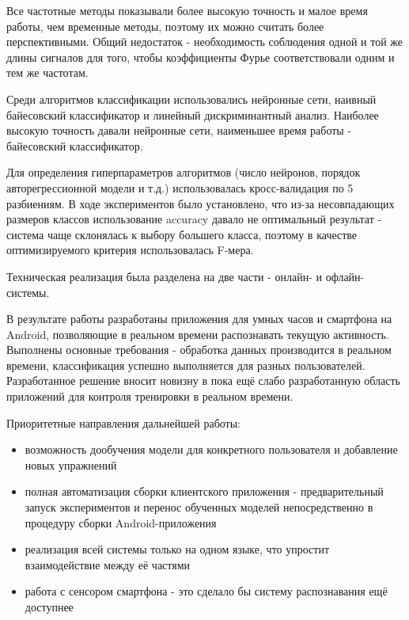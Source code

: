 Все частотные методы показывали более высокую точность и малое время работы, чем временные методы, поэтому их можно считать более перспективными. Общий недостаток - необходимость соблюдения одной и той же длины сигналов для того, чтобы коэффициенты Фурье соответствовали одним и тем же частотам.

Среди алгоритмов классификации использовались нейронные сети, наивный байесовский классификатор и линейный дискриминантный анализ. Наиболее высокую точность давали нейронные сети, наименьшее время работы - байесовский классификатор.

Для определения гиперпараметров алгоритмов (число нейронов, порядок авторегрессионной модели и т.д.) использовалась кросс-валидация по 5 разбиениям. В ходе экспериментов было установлено, что из-за несовпадающих размеров классов использование accuracy давало не оптимальный результат - система чаще склонялась к выбору большего класса, поэтому в качестве оптимизируемого критерия использовалась F-мера.


Техническая реализация была разделена на две части - онлайн- и офлайн-системы. 

В результате работы разработаны приложения для умных часов и смартфона на Android, позволяющие в реальном времени распознавать текущую активность. Выполнены основные требования - обработка данных производится в реальном времени, классификация успешно выполняется для разных пользователей. Разработанное решение вносит новизну в пока ещё слабо разработанную область приложений для контроля тренировки в реальном времени.

Приоритетные направления дальнейшей работы:

\begin{itemize}
\item возможность дообучения модели для конкретного пользователя и добавление новых упражнений
\item полная автоматизация сборки клиентского приложения - предварительный запуск экспериментов и перенос обученных моделей непосредственно в процедуру сборки Android-приложения
\item реализация всей системы только на одном языке, что упростит взаимодействие между её частями
\item работа с сенсором смартфона - это сделало бы систему распознавания ещё доступнее
\end{itemize}

